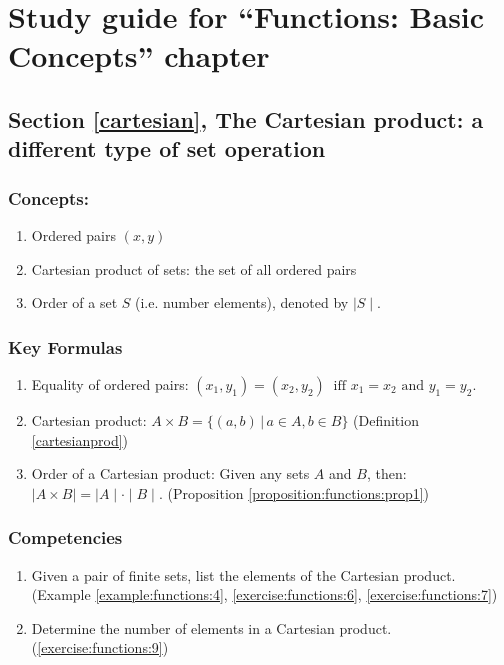 \section{Study guide  for ``Functions: Basic Concepts''  chapter}
\label{sec:functions:study} 
\subsection*{Section \ref{cartesian}, The Cartesian product: a different type of set operation}
\subsubsection*{Concepts:}
\begin{enumerate}
\item 
Ordered pairs $(x, y)$
\item
Cartesian product of sets: the set of all ordered pairs
\item
Order of a set $S$ (i.e. number elements), denoted by $\mid S\mid $.
\end{enumerate}

\subsubsection*{Key Formulas}
\begin{enumerate}
\item
Equality of ordered pairs: $(x_{1}, y_{1}) = (x_{2}, y_{2})~ \mbox{ iff }  x_{1} = x_{2} \mbox{ and } y_{1} = y_{2}.$
\item
Cartesian product: $A \times B = \{ (a, b) \, | \, a \in A, b \in B \}$  (Definition \ref{cartesianprod})
\item
Order of a Cartesian product: Given any sets $A$ and $B$, then: \\ $\mid A \times B \mid = \mid A \mid \cdot \mid B \mid. $ (Proposition \ref{proposition:functions:prop1})
\end{enumerate}

\subsubsection*{Competencies}
\begin{enumerate}
\item
Given a pair of finite sets, list the elements of the Cartesian product. (Example \ref{example:functions:4}, \ref{exercise:functions:6}, \ref{exercise:functions:7})
\item
Determine the number of elements in a Cartesian product. (\ref{exercise:functions:9})
\end{enumerate}


